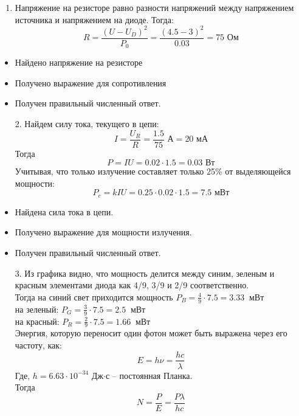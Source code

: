 \solutionSection
\begin{enumerate}
    \item Напряжение на резисторе равно разности напряжений между напряжением источника и напряжением на диоде. Тогда:
    $$R=\frac{(U-U_D)^2}{P_0}=\frac{(4.5-3)^2}{0.03}=75\text{ Ом}$$
    \end{enumerate}
    \additionalCriteria
    \begin{itemize}
    \item Найдено напряжение на резисторе
    \item Получено выражение для сопротивления
    \item Получен правильный численный ответ.
    \end{itemize}
    \begin{enumerate}
    \item [2.] Найдем силу тока, текущего в цепи:
    $$I=\frac{U_R}{R}=\frac{1.5}{75}\text{ А}=20\text{ мА}$$
    Тогда 
    $$P=IU=0.02\cdot1.5=0.03\text{ Вт}$$
    Учитывая, что только излучение составляет только 25\% от выделяющейся мощности:
    $$P_c=kIU=0.25\cdot0.02\cdot1.5=7.5\text{ мВт}$$
    \end{enumerate}
    \additionalCriteria
    \begin{itemize}
    \item Найдена сила тока в цепи.
    \item Получено выражение для мощности излучения.
    \item Получен правильный численный ответ.
    \end{itemize}
    \begin{enumerate}
    \item [3.] Из графика видно, что мощность делится между синим, зеленым и красным элементами диода как 4/9, 3/9 и 2/9 соответственно.\\ 
    Тогда на синий свет приходится мощность $P_B=\frac{4}{9}\cdot7.5=3.33 \: \text{ мВт}$\\
    на зеленый: $P_G=\frac{3}{9}\cdot7.5=2.5\:\text{ мВт}$\\
    на красный: $P_R=\frac{2}{9}\cdot7.5=1.66\:\text{ мВт}$\\
    Энергия, которую переносит один фотон может быть выражена через его частоту, как:
    $$E=h\nu=\frac{hc}{\lambda}$$
    Где, $h = 6.63\cdot10^{-34}$ Дж$\cdot$с – постоянная Планка.\\
    Тогда 
    $$N=\frac{P}{E}=\frac{P\lambda}{hc}$$
    \end{enumerate}
